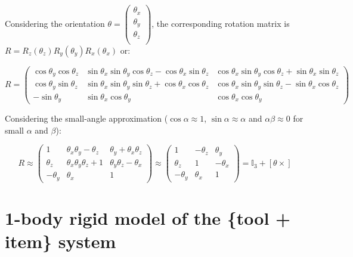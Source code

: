 \documentclass[\main/main.tex]{subfiles}
\begin{document}
Considering the orientation $\theta =
\begin{pmatrix}
 \theta_x \\
 \theta_y \\
 \theta_z \\
\end{pmatrix}
$,
the corresponding rotation matrix is $R = R_z(\theta_z)R_y(\theta_y)R_x(\theta_x)$ or:

\begin{equation*}
 R =
 \begin{pmatrix}
  \cos \theta_y \cos \theta_z & \sin \theta_x \sin \theta_y \cos \theta_z - \cos \theta_x \sin \theta_z & \cos \theta_x \sin \theta_y \cos \theta_z + \sin \theta_x \sin \theta_z \\
  \cos \theta_y \sin \theta_z & \sin \theta_x \sin \theta_y \sin \theta_z + \cos \theta_x \cos \theta_z & \cos \theta_x \sin \theta_y \sin \theta_z - \sin \theta_x \cos \theta_z \\
  - \sin \theta_y             & \sin \theta_x \cos \theta_y                                             & \cos \theta_x \cos \theta_y
 \end{pmatrix}
\end{equation*}

Considering the small-angle approximation ($\cos \alpha \approx 1$, $\sin \alpha \approx \alpha$ and $\alpha \beta \approx 0$ for small $\alpha$ and $\beta$):

\begin{equation}
 R \approx
 \begin{pmatrix}
  1         & \theta_x \theta_y -\theta_z    & \theta_y + \theta_x \theta_z \\
  \theta_z  & \theta_x \theta_y \theta_z + 1 & \theta_y \theta_z -\theta_x  \\
  -\theta_y & \theta_x                       & 1
 \end{pmatrix}
 \approx
 \begin{pmatrix}
  1         & -\theta_z & \theta_y  \\
  \theta_z  & 1         & -\theta_x \\
  -\theta_y & \theta_x  & 1
 \end{pmatrix}
 = \mathbb{I}_3 + \left[ \theta \times \right]
\end{equation}

\newpage

\section{1-body rigid model of the \{tool + item\} system}
\end{document}
